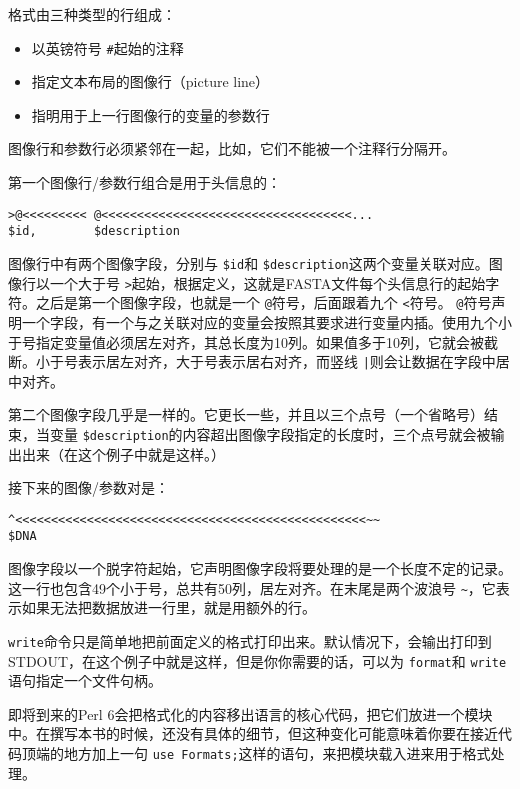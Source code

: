格式由三种类型的行组成：

\begin{itemize}
  \item 以英镑符号 \verb|#|起始的注释
  \item 指定文本布局的图像行（picture line）
  \item 指明用于上一行图像行的变量的参数行
\end{itemize}

图像行和参数行必须紧邻在一起，比如，它们不能被一个注释行分隔开。

第一个图像行/参数行组合是用于头信息的：

\begin{lstlisting}
>@<<<<<<<<< @<<<<<<<<<<<<<<<<<<<<<<<<<<<<<<<<<<<...
$id,        $description
\end{lstlisting}

图像行中有两个图像字段，分别与 \verb|$id|和 \verb|$description|这两个变量关联对应。图像行以一个大于号 \verb|>|起始，根据定义，这就是FASTA文件每个头信息行的起始字符。之后是第一个图像字段，也就是一个 \verb|@|符号，后面跟着九个 \verb|<|符号。 \verb|@|符号声明一个字段，有一个与之关联对应的变量会按照其要求进行变量内插。使用九个小于号指定变量值必须居左对齐，其总长度为10列。如果值多于10列，它就会被截断。小于号表示居左对齐，大于号表示居右对齐，而竖线 \verb=|=则会让数据在字段中居中对齐。

第二个图像字段几乎是一样的。它更长一些，并且以三个点号（一个省略号）结束，当变量 \verb|$description|的内容超出图像字段指定的长度时，三个点号就会被输出出来（在这个例子中就是这样。）

接下来的图像/参数对是：

\begin{lstlisting}
^<<<<<<<<<<<<<<<<<<<<<<<<<<<<<<<<<<<<<<<<<<<<<<<<<~~
$DNA
\end{lstlisting}

图像字段以一个脱字符起始，它声明图像字段将要处理的是一个长度不定的记录。这一行也包含49个小于号，总共有50列，居左对齐。在末尾是两个波浪号 \verb|~|，它表示如果无法把数据放进一行里，就是用额外的行。

 \verb|write|命令只是简单地把前面定义的格式打印出来。默认情况下，会输出打印到STDOUT，在这个例子中就是这样，但是你你需要的话，可以为 \verb|format|和 \verb|write|语句指定一个文件句柄。

即将到来的Perl 6会把格式化的内容移出语言的核心代码，把它们放进一个模块中。在撰写本书的时候，还没有具体的细节，但这种变化可能意味着你要在接近代码顶端的地方加上一句 \verb|use Formats;|这样的语句，来把模块载入进来用于格式处理。

